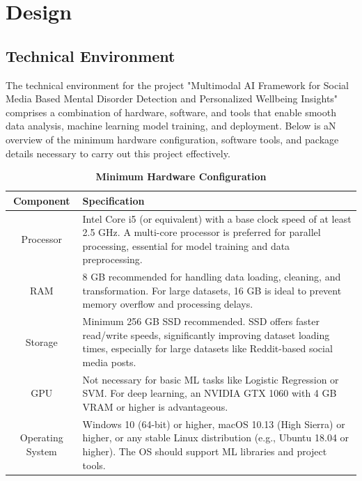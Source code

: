 
\section{Design}

\subsection{Technical Environment}
\noindent
The technical environment for the project "Multimodal AI Framework for Social Media Based Mental Disorder Detection and Personalized Wellbeing Insights" comprises a combination of hardware, software, and tools that enable smooth data analysis, machine learning model training, and deployment. Below is aN overview of the minimum hardware configuration, software tools, and package details necessary to carry out this project effectively. 

\begin{table}[h]
    \centering
    \renewcommand{\arraystretch}{1.2}
    \begin{tabular}{|c|p{12cm}|}
        \hline
        \textbf{Component} & \textbf{Specification} \\
        \hline
        Processor & Intel Core i5 (or equivalent) with a base clock speed of at least 2.5 GHz. A multi-core processor is preferred for parallel processing, essential for model training and data preprocessing. \\
        \hline
        RAM & 8 GB recommended for handling data loading, cleaning, and transformation. For large datasets, 16 GB is ideal to prevent memory overflow and processing delays. \\
        \hline
        Storage & Minimum 256 GB SSD recommended. SSD offers faster read/write speeds, significantly improving dataset loading times, especially for large datasets like Reddit-based social media posts. \\
        \hline
        GPU & Not necessary for basic ML tasks like Logistic Regression or SVM. For deep learning, an NVIDIA GTX 1060 with 4 GB VRAM or higher is advantageous. \\
        \hline
        Operating System & Windows 10 (64-bit) or higher, macOS 10.13 (High Sierra) or higher, or any stable Linux distribution (e.g., Ubuntu 18.04 or higher). The OS should support ML libraries and project tools. \\
        \hline
    \end{tabular}
    \caption*{\textbf{Minimum Hardware Configuration}}
\end{table}


